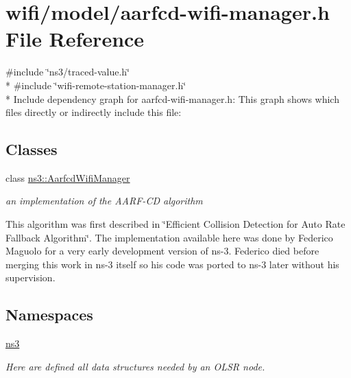 \hypertarget{aarfcd-wifi-manager_8h}{}\section{wifi/model/aarfcd-\/wifi-\/manager.h File Reference}
\label{aarfcd-wifi-manager_8h}
{\ttfamily \#include \char`\"{}ns3/traced-\/value.\+h\char`\"{}}\\*
{\ttfamily \#include \char`\"{}wifi-\/remote-\/station-\/manager.\+h\char`\"{}}\\*
Include dependency graph for aarfcd-\/wifi-\/manager.h\+:
This graph shows which files directly or indirectly include this file\+:
\subsection*{Classes}
\begin{DoxyCompactItemize}
\item 
class \hyperlink{classns3_1_1AarfcdWifiManager}{ns3\+::\+Aarfcd\+Wifi\+Manager}
\begin{DoxyCompactList}\small\item\em an implementation of the A\+A\+R\+F-\/\+CD algorithm

This algorithm was first described in \char`\"{}\+Efficient Collision Detection for Auto Rate Fallback Algorithm\char`\"{}. The implementation available here was done by Federico Maguolo for a very early development version of ns-\/3. Federico died before merging this work in ns-\/3 itself so his code was ported to ns-\/3 later without his supervision. \end{DoxyCompactList}\end{DoxyCompactItemize}
\subsection*{Namespaces}
\begin{DoxyCompactItemize}
\item 
 \hyperlink{namespacens3}{ns3}
\begin{DoxyCompactList}\small\item\em Here are defined all data structures needed by an O\+L\+SR node. \end{DoxyCompactList}\end{DoxyCompactItemize}
